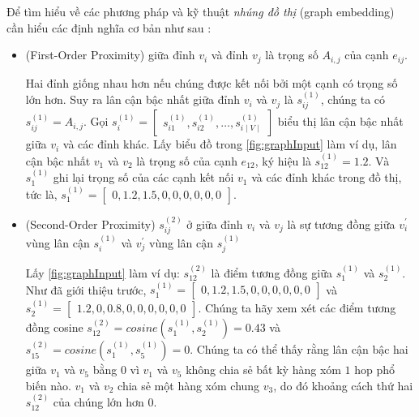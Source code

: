 Để tìm hiểu về các phương pháp và kỹ thuật \textit{nhúng đồ thị} (graph embedding) cần hiểu các định nghĩa cơ bản như sau :

\begin{itemize}
	\item
	\begin{definition}\label{def:firstOrderProximity}
		(First-Order Proximity)	giữa đỉnh $v_i$ và đỉnh $v_j$ là trọng số $A_{i, j}$ của cạnh $e_{ij}$.
	\end{definition}
	
	Hai đỉnh giống nhau hơn nếu chúng được kết nối bởi một cạnh có trọng số lớn hơn. Suy ra lân cận bậc nhất giữa đỉnh $v_i$ và $v_j$ là $s^{(1)}_{ij}$, chúng ta có $s^{(1)}_{ij} = A_{i, j}$. Gọi $s^{(1)}_{i} = \begin{bmatrix} s^{(1)}_{i1}, s^{(1)}_{i2}, \dots, s^{(1)}_{i \mid V \mid} \end{bmatrix}$ biểu thị lân cận bậc nhất giữa \(v_i\) và các đỉnh khác. Lấy biểu đồ trong \autoref{fig:graphInput} làm ví dụ, lân cận bậc nhất $v_1$ và $v_2$ là trọng số của cạnh $e_{12}$, ký hiệu là $s^{(1)}_{12} = 1.2$. Và $s^{(1)}_1$ ghi lại trọng số của các cạnh kết nối $v_1$ và các đỉnh khác trong đồ thị, tức là, $s^{(1)}_{1} = \begin{bmatrix}  0, 1.2, 1.5, 0, 0, 0, 0, 0, 0 \end{bmatrix} $.
	
	\item
	\begin{definition}\label{def:secondOrderProximity} (Second-Order Proximity)
		$s^{(2)}_{ij}$ ở giữa đỉnh $v_i$ và $v_j$ là sự tương đồng giữa $v^{\prime}_i$ vùng lân cận $s^{(1)}_i$ và $v^{\prime}_j$ vùng lân cận $s^{(1)}_j$
	\end{definition}
	
	Lấy \autoref{fig:graphInput} làm ví dụ: $s^{(2)}_{12}$ là điểm tương đồng giữa $s^{(1)}_{1}$ và $s^{(1)}_{2}$. Như đã giới thiệu trước, $s^{(1)}_1 = \begin{bmatrix} 0, 1.2, 1.5, 0, 0, 0, 0, 0, 0 \end{bmatrix}$ và $s^{(1)}_2 = \begin{bmatrix} 1.2, 0, 0.8, 0, 0, 0, 0 , 0, 0 \end{bmatrix}$. Chúng ta hãy xem xét các điểm tương đồng cosine $s^{(2)}_{12} = cosine (s^{(1)}_1, s^{(1)}_2) = 0.43$ và $s^{(2)}_{15} = cosine(s^{(1)}_1, s^{(1)}_5) = 0$. Chúng ta có thể thấy rằng lân cận bậc hai giữa $v_1$ và $v_5$ bằng $0$ vì $v_1$ và $v_5$ không chia sẻ bất kỳ hàng xóm $1$ hop phổ biến nào. $v_1$ và $v_2$ chia sẻ một hàng xóm chung $v_3$, do đó khoảng cách thứ hai $s^{(2)}_{12}$ của chúng lớn hơn 0.
	

\end{itemize}
